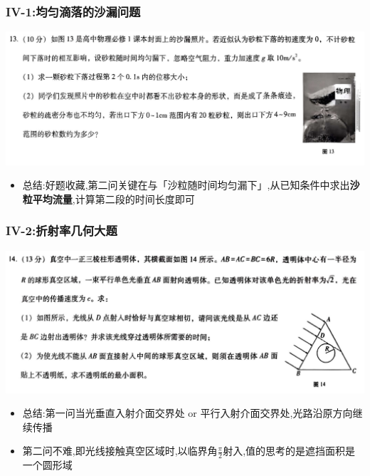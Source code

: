 \documentclass{article}
\begin{document}
\vspace{2em}

\subsubsection{IV-1:均匀滴落的沙漏问题}
\includegraphics[width=50em,keepaspectratio]{./pictures/3.1-4.png}

\begin{itemize}
    \item 总结:好题收藏,第二问关键在与「沙粒随时间均匀漏下」,从已知条件中求出\textbf{沙粒平均流量},计算第二段的时间长度即可
\end{itemize}

\vspace{2em}


\subsubsection{IV-2:折射率几何大题}
\includegraphics[width=50em,keepaspectratio]{./pictures/3.1-5.png}

\begin{itemize}
    \item 总结:第一问当光垂直入射介面交界处 or 平行入射介面交界处,光路沿原方向继续传播
    \item 第二问不难,即光线接触真空区域时,以临界角$\frac{\pi}{2}$射入,值的思考的是遮挡面积是一个圆形域
\end{itemize}

\vspace{2em}
\end{document}
